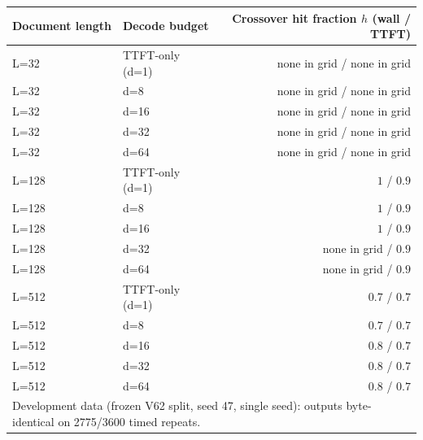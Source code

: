 \begin{tabular}{llr}
\toprule
Document length & Decode budget & Crossover hit fraction $h$ (wall / TTFT) \\
\midrule
L=32 & TTFT-only (d=1) & none in grid / none in grid \\
L=32 & d=8 & none in grid / none in grid \\
L=32 & d=16 & none in grid / none in grid \\
L=32 & d=32 & none in grid / none in grid \\
L=32 & d=64 & none in grid / none in grid \\
L=128 & TTFT-only (d=1) & $1$ / $0.9$ \\
L=128 & d=8 & $1$ / $0.9$ \\
L=128 & d=16 & $1$ / $0.9$ \\
L=128 & d=32 & none in grid / $0.9$ \\
L=128 & d=64 & none in grid / $0.9$ \\
L=512 & TTFT-only (d=1) & $0.7$ / $0.7$ \\
L=512 & d=8 & $0.7$ / $0.7$ \\
L=512 & d=16 & $0.8$ / $0.7$ \\
L=512 & d=32 & $0.8$ / $0.7$ \\
L=512 & d=64 & $0.8$ / $0.7$ \\
\midrule
\multicolumn{3}{l}{Development data (frozen V62 split, seed 47, single seed): outputs byte-identical on 2775/3600 timed repeats.} \\
\bottomrule
\end{tabular}
